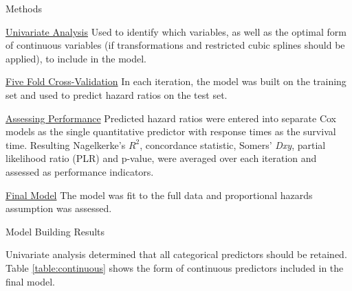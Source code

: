 \documentclass[final]{beamer}
\newlength{\onecolwid}
\newlength{\twocolwid}
\begin{document}
\begin{frame}[t]
\begin{columns}[t]
\begin{column}{\twocolwid}
\begin{columns}[t,totalwidth=\twocolwid]
\begin{column}{\onecolwid}\vspace{-.6in} %


\begin{block}{Methods}

\textcolor{dblue!70}{} \underline{Univariate Analysis} Used to identify which variables, as well as the optimal form of continuous variables (if transformations and restricted cubic splines should be applied), to include in the model.

\textcolor{dblue!70}{} \underline{Five Fold Cross-Validation} In each iteration, the model was built on the training set and used to predict hazard ratios on the test set. 

\textcolor{dblue!70}{} \underline{Assessing Performance} Predicted hazard ratios were entered into separate Cox models as the single quantitative predictor with response times as the survival time. Resulting Nagelkerke's $R^2$, concordance statistic, Somers' \textit{Dxy}, partial likelihood ratio (PLR) and p-value, were averaged over each iteration and assessed as performance indicators.  

\textcolor{dblue!70}{} \underline{Final Model} The model was fit to the full data and proportional hazards assumption was assessed.

\end{block}


\begin{block}{Model Building Results}

Univariate analysis determined that all categorical predictors should be retained. Table \ref{table:continuous} shows the form of continuous predictors included in the final model. 


\end{block}
\end{column}
\end{columns}
\end{column}
\end{columns}
\end{frame}
\end{document}
